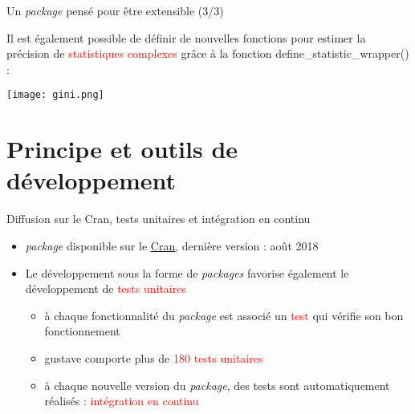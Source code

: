 \documentclass[xcolor=dvipsnames]{beamer}
\begin{document}
\begin{frame}{Un \textit{package} pensé pour être extensible (3/3)}

Il est également possible de définir de nouvelles fonctions pour estimer la précision de \textcolor{red}{statistiques complexes} grâce à la fonction define\_statistic\_wrapper() :

\begin{center}
    \texttt{[image: gini.png]}
\end{center}    

\end{frame}


\section{Principe et outils de développement}

\begin{frame}{Diffusion sur le Cran, tests unitaires et intégration en continu}

\begin{itemize}
    \item \textit{package} disponible sur le \underline{\href{https://cran.r-project.org/web/packages/gustave/index.html}{Cran}}, dernière version : août 2018
    \vspace{0.5 cm}
    \item Le développement sous la forme de \textit{packages} favorise également le développement de \textcolor{red}{tests unitaires}
    \vspace{0.2 cm}
    \begin{itemize}
        \item à chaque fonctionnalité du \textit{package} est associé un \textcolor{red}{test} qui vérifie son bon fonctionnement
        \vspace{0.2 cm}
        \item gustave comporte plus de \textcolor{red}{180 tests unitaires}
        \vspace{0.2 cm}
        \item à chaque nouvelle version du \textit{package}, des tests sont automatiquement réalisés : \textcolor{red}{intégration en continu}
    \end{itemize}
\end{itemize}
    
\end{frame}
\end{document}
